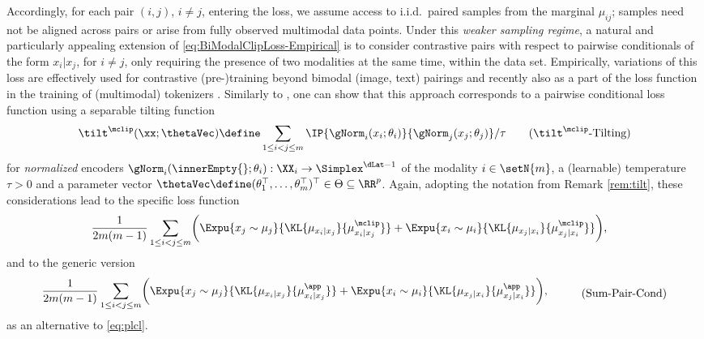 \documentclass{article}
\begin{document}
Accordingly, for each pair $(i,j)$, $i\neq j$, entering the loss, we assume access
 to i.i.d.\ paired samples from the marginal $\mu_{ij}$; samples need not be
 aligned across pairs or arise from fully observed multimodal data points.
 Under this \emph{weaker sampling regime}, a natural and particularly appealing
 extension of
\eqref{eq:BiModalClipLoss-Empirical} is to consider contrastive pairs with
respect to pairwise conditionals of the form $x_i \vert x_j$, for $i\neq
 j$, only requiring the presence of two modalities at the same time, within
the data set. Empirically, variations of this loss are effectively used for
contrastive (pre-)training beyond bimodal (image, text) pairings
\citep{portillo-quinteroStraightforwardFrameworkVideo2021a,
 luoCLIP4ClipEmpiricalStudy2022, guzhovAudioclipExtendingClip2022,
 nagraniLearningAudioVideoModalities2022, tevetMotionCLIPExposingHuman2022,
 girdharImageBindOneEmbedding2023, zhuBringingMultimodalityAmazon2024,
 zhouTENTConnectLanguage2026} and recently also as a part of the loss
function in the training of (multimodal) tokenizers
\citep{luATokenUnifiedTokenizer2025}.
Similarly to , one can show that this approach corresponds to
a pairwise conditional loss function using a separable tilting function
\begin{align}
 \tilt^{\mclip}(\xx; \thetaVec) \define
 \sum_{1\leq i < j \leq m} \IP{\gNorm_i(x_i; \theta_i)}{\gNorm_j(x_j;\theta_j)}/\tau
 \tag{\ensuremath{\tilt^\mclip}-Tilting}
 \label{eq:ClipTiltingFunctionGeneral}
\end{align}
for \emph{normalized} encoders $\gNorm_i(\innerEmpty{};\theta_i):\XX_i \to
 \Simplex^{\dLat -1}$ of the modality $i\in \setN{m}$,
a (learnable) temperature $\tau > 0$ and a parameter vector
$\thetaVec \define (\theta_1^\top, \ldots, \theta_m^\top)^\top \in \Theta \subseteq \RR^p$.
Again, adopting the notation from Remark \ref{rem:tilt},
these considerations lead to the specific loss function
\begin{align*}
 \begin{aligned}
  \frac{1}{2m(m-1)} \sum_{1 \leq i < j \leq m}
  \biggl(
   & \Expu{x_j\sim \mu_j}{\KL{\mu_{x_i\vert x_j}}{\mu^\mclip_{x_i\vert x_j}}}
  + \Expu{x_i\sim \mu_i}{\KL{\mu_{x_j\vert x_i}}{\mu^\mclip_{x_j\vert x_i}}}
  \biggr),
 \end{aligned}
 \notag
\end{align*}
and to the generic version
\begin{align*}
 \begin{aligned}
  \frac{1}{2m(m-1)} \sum_{1 \leq i < j \leq m}
  \biggl(
   & \Expu{x_j\sim \mu_j}{\KL{\mu_{x_i\vert x_j}}{\mu^\app_{x_i\vert x_j}}}
  + \Expu{x_i\sim \mu_i}{\KL{\mu_{x_j\vert x_i}}{\mu^\app_{x_j\vert x_i}}}
  \biggr),
 \end{aligned}
 \tag{Sum-Pair-Cond}
 \label{eq:plcl2}
\end{align*}
as an alternative to \eqref{eq:plcl}.
\end{document}
